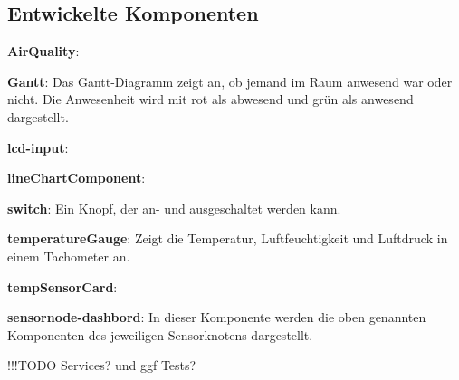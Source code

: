\subsection{Entwickelte Komponenten}

\item \textbf{AirQuality}:
\item \textbf{Gantt}:
Das Gantt-Diagramm zeigt an, ob jemand im Raum anwesend war oder nicht. Die Anwesenheit wird mit rot als abwesend und grün als anwesend dargestellt.
\item \textbf{lcd-input}:
\item \textbf{lineChartComponent}:
\item \textbf{switch}:
Ein Knopf, der an- und ausgeschaltet werden kann.
\item \textbf{temperatureGauge}:
Zeigt die Temperatur, Luftfeuchtigkeit und Luftdruck in einem Tachometer an.
\item \textbf{tempSensorCard}:
\item \textbf{sensornode-dashbord}:
In dieser Komponente werden die oben genannten Komponenten des jeweiligen Sensorknotens dargestellt.

!!!TODO Services? und ggf Tests?

